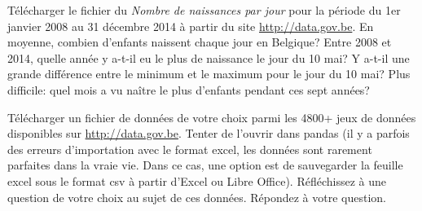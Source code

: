\begin{exercice}
Télécharger le fichier du 
\emph{Nombre de naissances par jour} pour la période du 1er janvier 2008 au 31
décembre 2014 à partir du site \url{http://data.gov.be}.
En moyenne, combien d'enfants naissent chaque jour en Belgique?
Entre 2008 et 2014, quelle année y a-t-il eu le plus de naissance le jour du 10
mai? Y a-t-il une grande différence entre le minimum et le maximum pour le jour
du 10 mai? Plus difficile: quel mois a vu naître le plus d'enfants pendant ces
sept années?
\end{exercice}

\begin{exercice}
Télécharger un fichier de données de votre choix parmi les 4800+ jeux de données
disponibles sur \url{http://data.gov.be}. Tenter de l'ouvrir dans pandas (il y a
parfois des erreurs d'importation avec le format excel, les données sont
rarement parfaites dans la vraie vie. Dans ce cas, une option est de sauvegarder
la feuille excel sous le format csv à partir d'Excel ou Libre Office).
Réfléchissez à une question de votre choix au sujet de ces données. Répondez à
votre question.
\end{exercice}


